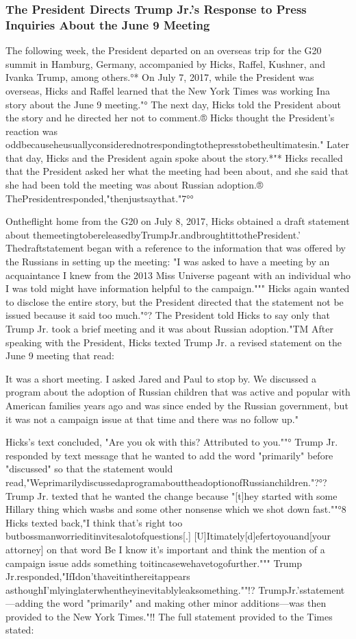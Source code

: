 \subsubsection{The President Directs Trump Jr.'s Response to Press Inquiries About the June 9 Meeting}

The following week, the President departed on an overseas trip for the G20 summit in Hamburg, Germany, accompanied by Hicks, Raffel, Kushner, and Ivanka Trump, among others.°*
On July 7, 2017, while the President was overseas, Hicks and Raffel learned that the New York Times was working Ina story about the June 9 meeting."°
The next day, Hicks told the President about the story and he directed her not to comment.®
Hicks thought the President's reaction was oddbecauseheusuallyconsiderednotrespondingtothepresstobetheultimatesin."
Later that day, Hicks and the President again spoke about the story.*"*
Hicks recalled that the President asked her what the meeting had been about, and she said that she had been told the meeting was about Russian adoption.® ThePresidentresponded,"thenjustsaythat."7°°

Ontheflight home from the G20 on July 8, 2017, Hicks obtained a draft statement about themeetingtobereleasedbyTrumpJr.andbroughtittothePresident.'
Thedraftstatement began with a reference to the information that was offered by the Russians in setting up the meeting: "I was asked to have a meeting by an acquaintance I knew from the 2013 Miss Universe pageant with an individual who I was told might have information helpful to the campaign."""
Hicks again wanted to disclose the entire story, but the President directed that the statement not be
issued because it said too much."°? The President told Hicks to say only that Trump Jr. took a brief meeting and it was about Russian adoption."TM
After speaking with the President, Hicks texted Trump Jr. a revised statement on the June 9 meeting that read:

It was a short meeting.
I asked Jared and Paul to stop by.
We discussed a program about the adoption of Russian children that was active and popular with American families years ago and was since ended by the Russian government, but it was not a campaign issue at that time and there was no follow up."

Hicks's text concluded, "Are you ok with this? Attributed to you.""°
Trump Jr. responded by text message that he wanted to add the word "primarily" before "discussed" so that the statement would read,"WeprimarilydiscussedaprogramabouttheadoptionofRussianchildren."?°?
Trump Jr. texted that he wanted the change because "[t]hey started with some Hillary thing which wasbs and some other nonsense which we shot down fast.""°8
Hicks texted back,"I think that's right too butbossmanworrieditinvitesalotofquestions[.]
[U]Itimately[d]efertoyouand[your attorney] on that word Be I know it's important and think the mention of a campaign issue adds something toitincasewehavetogofurther."""
Trump Jr.responded,"IfIdon'thaveitinthereitappears asthoughI'mlyinglaterwhentheyinevitablyleaksomething.""!?
TrumpJr.'sstatement—adding the word "primarily" and making other minor additions—was then provided to the New York Times."!!
The full statement provided to the Times stated:

